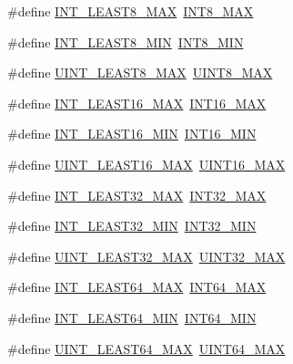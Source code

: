 \begin{DoxyCompactItemize}
\item 
\#define \hyperlink{group__avr__stdint_gaa05109908fb2770f632d2b646b9f85bf}{I\+N\+T\+\_\+\+L\+E\+A\+S\+T8\+\_\+\+M\+AX}~\hyperlink{group__avr__stdint_gaaf7f29f45f1a513b4748a4e5014ddf6a}{I\+N\+T8\+\_\+\+M\+AX}
\item 
\#define \hyperlink{group__avr__stdint_ga3e986cad833f63f420962ff60eda87e5}{I\+N\+T\+\_\+\+L\+E\+A\+S\+T8\+\_\+\+M\+IN}~\hyperlink{group__avr__stdint_gaadcf2a81af243df333b31efa6461ab8e}{I\+N\+T8\+\_\+\+M\+IN}
\item 
\#define \hyperlink{group__avr__stdint_ga2a80bde77ee1698d0f42f334adad4f2b}{U\+I\+N\+T\+\_\+\+L\+E\+A\+S\+T8\+\_\+\+M\+AX}~\hyperlink{group__avr__stdint_gaeb4e270a084ee26fe73e799861bd0252}{U\+I\+N\+T8\+\_\+\+M\+AX}
\item 
\#define \hyperlink{group__avr__stdint_ga7eb2a8e2a1c65d6c9ad0f86154890baa}{I\+N\+T\+\_\+\+L\+E\+A\+S\+T16\+\_\+\+M\+AX}~\hyperlink{group__avr__stdint_gac58f2c111cc9989c86db2a7dc4fd84ca}{I\+N\+T16\+\_\+\+M\+AX}
\item 
\#define \hyperlink{group__avr__stdint_ga1f91bfd5820c2f27af3d260fc75813e1}{I\+N\+T\+\_\+\+L\+E\+A\+S\+T16\+\_\+\+M\+IN}~\hyperlink{group__avr__stdint_gad4e9955955b27624963643eac448118a}{I\+N\+T16\+\_\+\+M\+IN}
\item 
\#define \hyperlink{group__avr__stdint_ga6ef6a1a518bbf516ca8b0180b11c358f}{U\+I\+N\+T\+\_\+\+L\+E\+A\+S\+T16\+\_\+\+M\+AX}~\hyperlink{group__avr__stdint_ga3ea490c9b3617d4479bd80ef93cd5602}{U\+I\+N\+T16\+\_\+\+M\+AX}
\item 
\#define \hyperlink{group__avr__stdint_ga5618711a0a54f722190a3a1219e278c2}{I\+N\+T\+\_\+\+L\+E\+A\+S\+T32\+\_\+\+M\+AX}~\hyperlink{group__avr__stdint_ga181807730d4a375f848ba139813ce04f}{I\+N\+T32\+\_\+\+M\+AX}
\item 
\#define \hyperlink{group__avr__stdint_ga2360a536116dd734820a6b5b3d560ce7}{I\+N\+T\+\_\+\+L\+E\+A\+S\+T32\+\_\+\+M\+IN}~\hyperlink{group__avr__stdint_ga688eb21a22db27c2b2bd5836943cdcbe}{I\+N\+T32\+\_\+\+M\+IN}
\item 
\#define \hyperlink{group__avr__stdint_ga70cad8bacc9a6db301e1cdc86cc8d571}{U\+I\+N\+T\+\_\+\+L\+E\+A\+S\+T32\+\_\+\+M\+AX}~\hyperlink{group__avr__stdint_gab5eb23180f7cc12b7d6c04a8ec067fdd}{U\+I\+N\+T32\+\_\+\+M\+AX}
\item 
\#define \hyperlink{group__avr__stdint_ga35d0f98a2e507fd1be779d49da92724e}{I\+N\+T\+\_\+\+L\+E\+A\+S\+T64\+\_\+\+M\+AX}~\hyperlink{group__avr__stdint_gad0d744f05898e32d01f73f8af3cd2071}{I\+N\+T64\+\_\+\+M\+AX}
\item 
\#define \hyperlink{group__avr__stdint_gac12b4f6966b57ad82feb683b284b4060}{I\+N\+T\+\_\+\+L\+E\+A\+S\+T64\+\_\+\+M\+IN}~\hyperlink{group__avr__stdint_gab21f12f372f67b8ff0aa3432336ede67}{I\+N\+T64\+\_\+\+M\+IN}
\item 
\#define \hyperlink{group__avr__stdint_gaab530113fa96e280e49c3c138b0f917d}{U\+I\+N\+T\+\_\+\+L\+E\+A\+S\+T64\+\_\+\+M\+AX}~\hyperlink{group__avr__stdint_ga30654b4b67d97c42ca3f9b6052dda916}{U\+I\+N\+T64\+\_\+\+M\+AX}
\end{DoxyCompactItemize}
